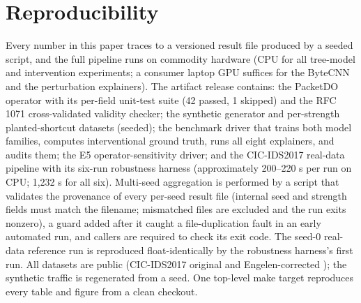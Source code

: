 \documentclass[journal]{IEEEtran}
\begin{document}
\section{Reproducibility}

Every number in this paper traces to a versioned result file produced by
a seeded script, and the full pipeline runs on commodity hardware (CPU
for all tree-model and intervention experiments; a consumer laptop GPU
suffices for the ByteCNN and the perturbation explainers). The artifact
release contains: the PacketDO operator with its per-field unit-test
suite (42 passed, 1 skipped) and the RFC 1071 cross-validated validity
checker; the synthetic generator and per-strength planted-shortcut
datasets (seeded); the benchmark driver that trains both model families,
computes interventional ground truth, runs all eight explainers, and
audits them; the E5 operator-sensitivity driver; and the CIC-IDS2017
real-data pipeline with its six-run robustness harness (approximately
200--220 s per run on CPU; 1,232 s for all six). Multi-seed aggregation
is performed by a script that validates the provenance of every per-seed
result file (internal seed and strength fields must match the filename;
mismatched files are excluded and the run exits nonzero), a guard added
after it caught a file-duplication fault in an early automated run, and
callers are required to check its exit code. The seed-0 real-data
reference run is reproduced float-identically by the robustness
harness's first run. All datasets are public (CIC-IDS2017 original and
Engelen-corrected \cite{engelen2021troubleshooting}); the synthetic
traffic is regenerated from a seed. One top-level make target reproduces
every table and figure from a clean checkout.



\end{document}
